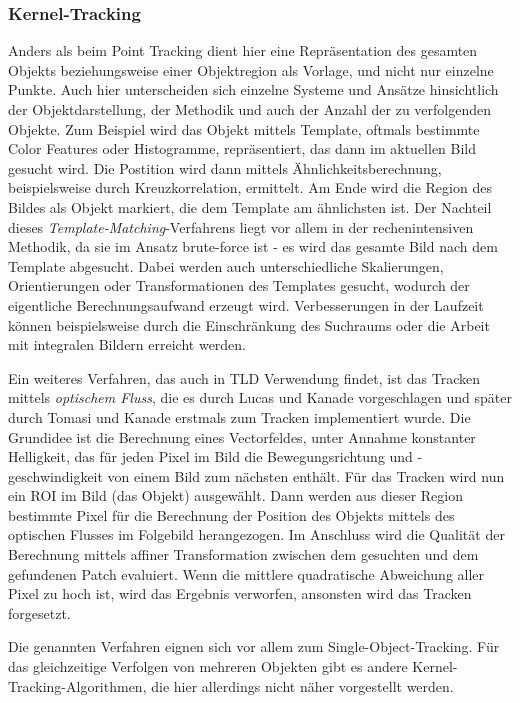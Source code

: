 \subsubsection{Kernel-Tracking}
Anders als beim Point Tracking dient hier eine Repräsentation des gesamten Objekts beziehungsweise einer Objektregion als Vorlage, und nicht nur einzelne Punkte. Auch hier unterscheiden sich einzelne Systeme und Ansätze hinsichtlich der Objektdarstellung, der Methodik und auch der Anzahl der zu verfolgenden Objekte. Zum Beispiel wird das Objekt mittels Template, oftmals bestimmte Color Features oder Histogramme, repräsentiert, das dann im aktuellen Bild gesucht wird. Die Postition wird dann mittels Ähnlichkeitsberechnung, beispielsweise durch Kreuzkorrelation, ermittelt. Am Ende wird die Region des Bildes als Objekt markiert, die dem Template am ähnlichsten ist. Der Nachteil dieses \textit{Template-Matching}-Verfahrens liegt vor allem in der rechenintensiven Methodik, da sie im Ansatz brute-force ist - es wird das gesamte Bild nach dem Template abgesucht. Dabei werden auch unterschiedliche Skalierungen, Orientierungen oder Transformationen des Templates gesucht, wodurch der eigentliche Berechnungsaufwand erzeugt wird. Verbesserungen in der Laufzeit können beispielsweise durch die Einschränkung des Suchraums oder die Arbeit mit integralen Bildern\cite{INT} erreicht werden.

Ein weiteres Verfahren, das auch in TLD Verwendung findet, ist das Tracken mittels \textit{optischem Fluss}, die es durch Lucas und Kanade\cite{OPT} vorgeschlagen und später durch Tomasi und Kanade\cite{LKT} erstmals zum Tracken implementiert wurde. Die Grundidee ist die Berechnung eines Vectorfeldes, unter Annahme konstanter Helligkeit, das für jeden Pixel im Bild die Bewegungsrichtung und -geschwindigkeit von einem Bild zum nächsten enthält. Für das Tracken wird nun ein ROI im Bild (das Objekt) ausgewählt. Dann werden aus dieser Region bestimmte Pixel für die Berechnung der Position des Objekts mittels des optischen Flusses im Folgebild herangezogen. Im Anschluss wird die Qualität der Berechnung mittels affiner Transformation zwischen dem gesuchten und dem gefundenen Patch evaluiert. Wenn die mittlere quadratische Abweichung aller Pixel zu hoch ist, wird das Ergebnis verworfen, ansonsten wird das Tracken forgesetzt.

Die genannten Verfahren eignen sich vor allem zum Single-Object-Tracking. Für das gleichzeitige Verfolgen von mehreren Objekten gibt es andere Kernel-Tracking-Algorithmen, die hier allerdings nicht näher vorgestellt werden.

